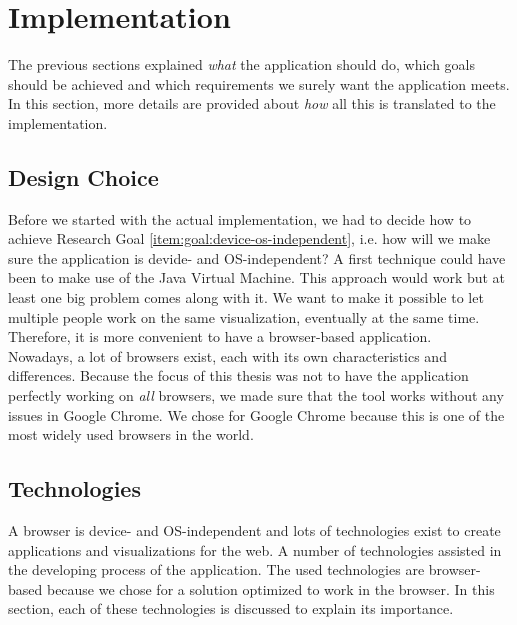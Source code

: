 \chapter{Implementation}\label{ch:implementation}

The previous sections explained \textit{what} the application should do, which goals should be achieved and which requirements we surely want the application meets. In this section, more details are provided about \textit{how} all this is translated to the implementation.

\section{Design Choice}
Before we started with the actual implementation, we had to decide how to achieve Research Goal \ref{item:goal:device-os-independent}, i.e. how will we make sure the application is devide- and OS-independent? A first technique could have been to make use of the Java Virtual Machine. This approach would work but at least one big problem comes along with it. We want to make it possible to let multiple people work on the same visualization, eventually at the same time. Therefore, it is more convenient to have a browser-based application.\\

Nowadays, a lot of browsers exist, each with its own characteristics and differences. Because the focus of this thesis was not to have the application perfectly working on \textit{all} browsers, we made sure that the tool works without any issues in Google Chrome. We chose for Google Chrome because this is one of the most widely used browsers in the world.

\section{Technologies}\label{sec:technologies}
A browser is device- and OS-independent and lots of technologies exist to create applications and visualizations for the web. A number of technologies assisted in the developing process of the application. The used technologies are browser-based because we chose for a solution optimized to work in the browser. In this section, each of these technologies is discussed to explain its importance.

